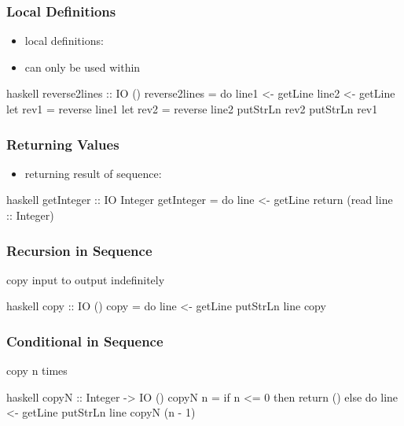 \documentclass[dvipsnames]{beamer}
\theoremstyle{plain}
\begin{document}
\begin{frame}[fragile]
  \frametitle{Local Definitions}

  \begin{itemize}
    \item local definitions: 
    \item can only be used within 
  \end{itemize}

  \begin{exampleblock}{}
    \begin{pygments}{haskell}
reverse2lines :: IO ()
reverse2lines = do
    line1 <- getLine
    line2 <- getLine
    let rev1 = reverse line1
    let rev2 = reverse line2
    putStrLn rev2
    putStrLn rev1
    \end{pygments}
  \end{exampleblock}
\end{frame}

\begin{frame}[fragile]
  \frametitle{Returning Values}

  \begin{itemize}
    \item returning result of sequence: 
  \end{itemize}

  \begin{exampleblock}{}
    \begin{pygments}{haskell}
getInteger :: IO Integer
getInteger = do
    line <- getLine
    return (read line :: Integer)
    \end{pygments}
  \end{exampleblock}
\end{frame}

\begin{frame}[fragile]
  \frametitle{Recursion in Sequence}

  \begin{exampleblock}{copy input to output indefinitely}
    \begin{pygments}{haskell}
copy :: IO ()
copy = do
    line <- getLine
    putStrLn line
    copy
    \end{pygments}
  \end{exampleblock}
\end{frame}

\begin{frame}[fragile]
  \frametitle{Conditional in Sequence}

  \begin{exampleblock}{copy n times}
    \begin{pygments}{haskell}
copyN :: Integer -> IO ()
copyN n =
    if n <= 0
        then return ()
        else do
            line <- getLine
            putStrLn line
            copyN (n - 1)
    \end{pygments}
  \end{exampleblock}
\end{frame}
\end{document}

